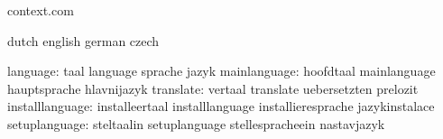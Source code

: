 


\startlogginginterface context.com



\startcommands                  dutch                        english
                                german                       czech

                     language:  taal                         language
                                sprache                      jazyk
                 mainlanguage:  hoofdtaal                    mainlanguage
                                hauptsprache                 hlavnijazyk
                    translate:  vertaal                      translate
                                uebersetzten                 prelozit
              installlanguage:  installeertaal               installlanguage
                                installieresprache           jazykinstalace
                setuplanguage:  steltaalin                   setuplanguage
                                stellespracheein             nastavjazyk

